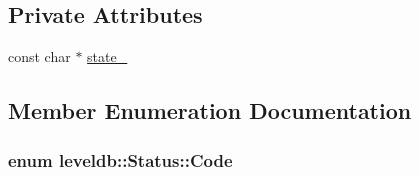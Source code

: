 \subsection*{Private Attributes}
\begin{DoxyCompactItemize}
\item 
const char $\ast$ \hyperlink{classleveldb_1_1_status_a883e92e066654d6e6deaaa31aa0c5e51}{state\-\_\-}
\end{DoxyCompactItemize}


\subsection{Member Enumeration Documentation}
\hypertarget{classleveldb_1_1_status_a86ca3f4adce279a55ac09d2b1595f79e}{
\subsubsection[{Code}]{\setlength{\rightskip}{0pt plus 5cm}enum {\bf leveldb\-::\-Status\-::\-Code}\hspace{0.3cm}{\ttfamily [private]}}}\label{classleveldb_1_1_status_a86ca3f4adce279a55ac09d2b1595f79e}
